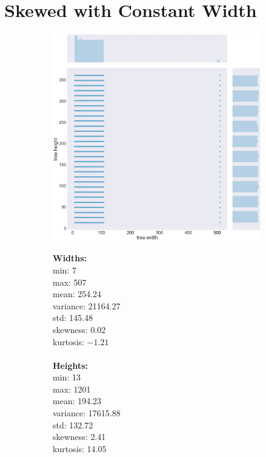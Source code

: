 \section{Skewed with Constant Width}
\label{appendix:data:skewedconstwidth}
\begin{figure}[H]
\centering
\begin{subfigure}{.8\textwidth}
	\includegraphics[width=.9\textwidth]{img/6_SKEWEDCONSTWIDTH_plot.png}
\end{subfigure}%
\begin{subfigure}{.2\textwidth}
  \centering
  \begin{minipage}{1\textwidth}
\textbf{Widths:}
\\
min: 7
\\
max: 507
\\
mean: 254.24
\\
variance: 21164.27
\\
std: 145.48
\\
skewness: 0.02
\\
kurtosis: $-1.21$
\\\\
\textbf{Heights:}
\\
min: 13
\\
max: 1201
\\
mean: 194.23
\\
variance: 17615.88
\\
std: 132.72
\\
skewness: 2.41
\\
kurtosis: 14.05
  \end{minipage}
\end{subfigure}
\end{figure}